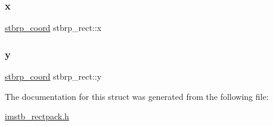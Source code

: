 \subsubsection{\texorpdfstring{x}{x}}
{\footnotesize\ttfamily \mbox{\hyperlink{imstb__rectpack_8h_ac2c2491b95dea6a298b7423dc762dfd9}{stbrp\+\_\+coord}} stbrp\+\_\+rect\+::x}

\mbox{\label{structstbrp__rect_ae3034c1fbf86043b568f5a4dddf946fa}} 
\subsubsection{\texorpdfstring{y}{y}}
{\footnotesize\ttfamily \mbox{\hyperlink{imstb__rectpack_8h_ac2c2491b95dea6a298b7423dc762dfd9}{stbrp\+\_\+coord}} stbrp\+\_\+rect\+::y}



The documentation for this struct was generated from the following file\+:\begin{DoxyCompactItemize}
\item 
\mbox{\hyperlink{imstb__rectpack_8h}{imstb\+\_\+rectpack.\+h}}\end{DoxyCompactItemize}
